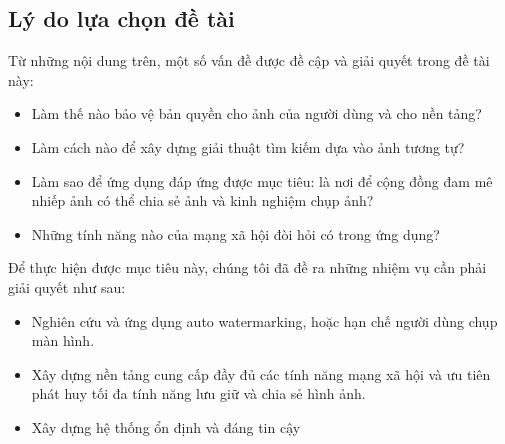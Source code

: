 \subsection{Lý do lựa chọn đề tài}
Từ những nội dung trên, một số vấn đề được đề cập và giải quyết trong đề tài này:
    \begin{itemize}
        \item Làm thế nào bảo vệ bản quyền cho ảnh của người dùng và cho nền tảng?
        \item Làm cách nào để xây dựng giải thuật tìm kiếm dựa vào ảnh tương tự?
        \item Làm sao để ứng dụng đáp ứng được mục tiêu: là nơi để cộng đồng đam mê nhiếp ảnh có thể chia sẻ ảnh và kinh nghiệm chụp ảnh?
        \item Những tính năng nào của mạng xã hội đòi hỏi có trong ứng dụng?
    \end{itemize}

Để thực hiện được mục tiêu này, chúng tôi đã đề ra những nhiệm vụ cần phải giải quyết như sau:
    \begin{itemize}
        \item Nghiên cứu và ứng dụng auto watermarking, hoặc hạn chế người dùng chụp màn hình.
        \item Xây dựng nền tảng cung cấp đầy đủ các tính năng mạng xã hội và ưu tiên phát huy tối đa tính năng lưu giữ và chia sẻ hình ảnh.
        \item Xây dựng hệ thống ổn định và đáng tin cậy
    \end{itemize}
